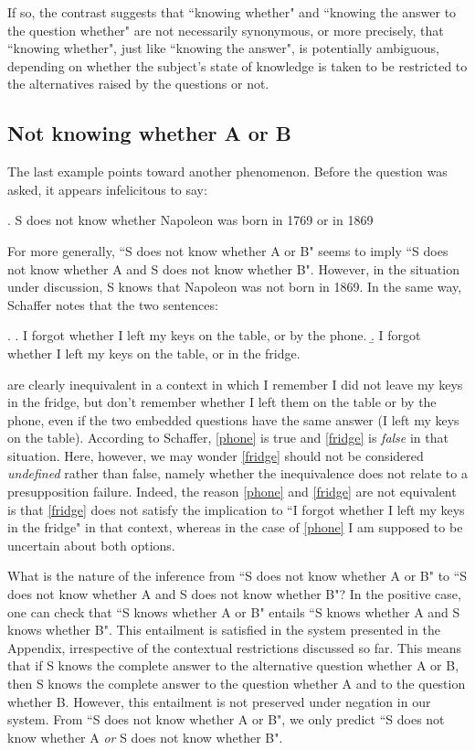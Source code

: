 \noindent If so, the contrast suggests that ``knowing whether" and
``knowing the answer to the question whether" are not necessarily
synonymous, or more precisely, that ``knowing whether", just like
``knowing the answer", is potentially ambiguous, depending on
whether the subject's state of knowledge is taken to be restricted
to the alternatives raised by the questions or not.


\subsection{Not knowing whether A or B}

The last example points toward another phenomenon. Before the
question was asked, it appears infelicitous to say:

\ex. S does not know whether Napoleon was born in 1769 or in 1869

For more generally, ``S does not know whether A or B" seems to
imply ``S does not know whether A and S does not know whether B".
However, in the situation under discussion, S knows that Napoleon
was not born in 1869. In the same way, Schaffer notes that the two
sentences:

\ex. \a. \label{phone} I forgot whether I left my keys on the
table, or by the phone. \b. \label{fridge} I forgot whether I left
my keys on the table, or in the fridge.

\noindent are clearly inequivalent in a context in which I
remember I did not leave my keys in the fridge, but don't remember
whether I left them on the table or by the phone, even if the two
embedded questions have the same answer (I left my keys on the
table). According to Schaffer, \ref{phone} is true and
\ref{fridge} is \emph{false} in that situation. Here, however, we
may wonder \ref{fridge} should not be considered \emph{undefined}
rather than false, namely whether the inequivalence does not
relate to a presupposition failure. Indeed, the reason \ref{phone}
and \ref{fridge} are not equivalent is that \ref{fridge} does not
satisfy the implication to ``I forgot whether I left my keys in
the fridge" in that context, whereas in the case of \ref{phone} I
am supposed to be uncertain about both options.

What is the nature of the inference from ``S does not know whether
A or B" to ``S does not know whether A and S does not know whether
B"? In the positive case, one can check that ``S knows whether A
or B" entails ``S knows whether A and S knows whether B". This
entailment is satisfied in the system presented in the Appendix,
irrespective of the contextual restrictions discussed so far. This
means that if S knows the complete answer to the alternative
question whether A or B, then S knows the complete answer to the
question whether A and to the question whether B. However, this
entailment is not preserved under negation in our system. From ``S
does not know whether A or B", we only predict ``S does not know
whether A \emph{or} S does not know whether B".

